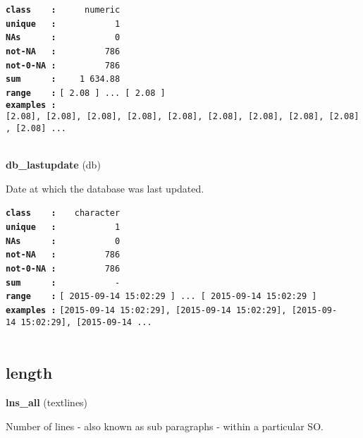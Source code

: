 \documentclass[]{article}
\begin{document}
\textbf{\texttt{class\ \ \ \ :}} \texttt{~~~~~numeric}\\
\textbf{\texttt{unique\ \ \ :}} \texttt{~~~~~~~~~~~1}\\
\textbf{\texttt{NAs\ \ \ \ \ \ :}} \texttt{~~~~~~~~~~~0}\\
\textbf{\texttt{not-NA\ \ \ :}} \texttt{~~~~~~~~~786}\\
\textbf{\texttt{not-0-NA\ :}} \texttt{~~~~~~~~~786}\\
\textbf{\texttt{sum\ \ \ \ \ \ :}} \texttt{~~~~1~634.88}\\
\textbf{\texttt{range\ \ \ \ :}}
\texttt{{[}\ 2.08\ {]}\ ...\ {[}\ 2.08\ {]}}\\
\textbf{\texttt{examples\ :}}
\texttt{{[}2.08{]},\ {[}2.08{]},\ {[}2.08{]},\ {[}2.08{]},\ {[}2.08{]},\ {[}2.08{]},\ {[}2.08{]},\ {[}2.08{]},\ {[}2.08{]},\ {[}2.08{]}\ ...}\\

~

\textbf{db\_lastupdate} (db)

Date at which the database was last updated.

\textbf{\texttt{class\ \ \ \ :}} \texttt{~~~character}\\
\textbf{\texttt{unique\ \ \ :}} \texttt{~~~~~~~~~~~1}\\
\textbf{\texttt{NAs\ \ \ \ \ \ :}} \texttt{~~~~~~~~~~~0}\\
\textbf{\texttt{not-NA\ \ \ :}} \texttt{~~~~~~~~~786}\\
\textbf{\texttt{not-0-NA\ :}} \texttt{~~~~~~~~~786}\\
\textbf{\texttt{sum\ \ \ \ \ \ :}} \texttt{~~~~~~~~~~~-}\\
\textbf{\texttt{range\ \ \ \ :}}
\texttt{{[}\ 2015-09-14\ 15:02:29\ {]}\ ...\ {[}\ 2015-09-14\ 15:02:29\ {]}}\\
\textbf{\texttt{examples\ :}}
\texttt{{[}2015-09-14\ 15:02:29{]},\ {[}2015-09-14\ 15:02:29{]},\ {[}2015-09-14\ 15:02:29{]},\ {[}2015-09-14\ ...}\\

~

\subsection{length}\label{length}

\textbf{lns\_all} (textlines)

Number of lines - also known as sub paragraphs - within a particular SO.
\end{document}
